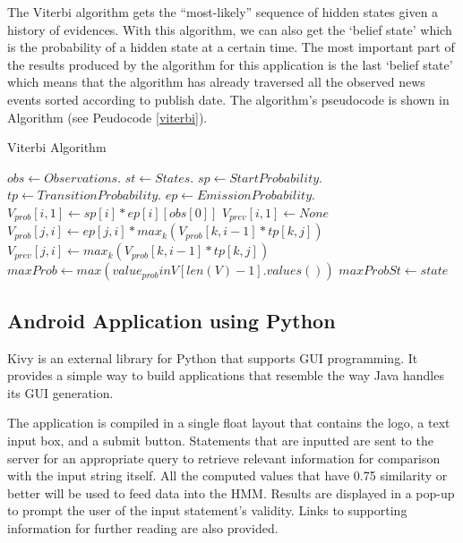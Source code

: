\documentclass[journal]{./IEEEtran}
\begin{document}
    The Viterbi algorithm gets the ``most-likely'' sequence of hidden states given a history of evidences. With this algorithm, we can also get the `belief state' which is the probability of a hidden state at a certain time. The most important part of the results produced by the algorithm for this application is the last `belief state' which means that the algorithm has already traversed all the observed news events sorted according to publish date. The algorithm's pseudocode is shown in Algorithm (see Peudocode \ref{viterbi}).
	
	\begin{algorithm}
    \caption{Viterbi Algorithm}\label{viterbi}
    \begin{algorithmic}[1]
    \State $obs \gets Observations$.
    \State $st \gets States$.
    \State $sp \gets StartProbability$.
    \State $tp \gets TransitionProbability$.
    \State $ep \gets EmissionProbability$.
    \State $V_{prob}[i,1] \gets sp[i]*ep[i][obs[0]]$
    \State $V_{prev}[i,1] \gets None$
    \EndFor
    \State $V_{prob}[j,i] \gets ep[j,i]*max_k(V_{prob}[k,i-1]*tp[k,j])$
    \State $V_{prev}[j,i] \gets max_k(V_{prob}[k,i-1]*tp[k,j])$
    \EndFor
    \EndFor
    \State $maxProb \gets max(value_{prob} in V[len(V)-1].values())$
    \State $maxProbSt \gets state$
    \EndIf
    \EndFor
    \State {}
    \EndFunction
    \end{algorithmic}
    \end{algorithm}
	
	\subsection{Android Application using Python}
	Kivy \cite{kivy16} is an external library for Python that supports GUI programming. It provides a simple way to build applications that resemble the way Java handles its GUI generation.
	
	The application is compiled in a single float layout that contains the logo, a text input box, and a submit button. Statements that are inputted are sent to the server for an appropriate query to retrieve relevant information for comparison with the input string itself. All the computed values that have 0.75 similarity or better will be used to feed data into the HMM. Results are displayed in a pop-up to prompt the user of the input statement's validity. Links to supporting information for further reading are also provided.	
	
\end{document}
